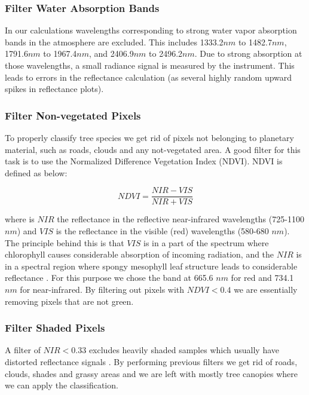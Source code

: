 \documentclass[remotesensing,article,accept,moreauthors,pdftex,12pt,a4paper]{mdpi}
\begin{document}
\subsubsection{Filter Water Absorption Bands}

In our calculations wavelengths corresponding to strong water vapor absorption bands in the atmosphere are excluded. This includes 1333.2$nm$ to 1482.7$nm$, 1791.6$n m$ to 1967.4$n m$, and 2406.9$n m$ to 2496.2$n m$. Due to strong absorption at those wavelengths, a small radiance signal is measured by the instrument. This leads to errors in the reflectance calculation (as several highly random upward spikes in reflectance plots). 

\subsubsection{Filter Non-vegetated Pixels}


To properly classify tree species we get rid of pixels not belonging to planetary material, such as roads, clouds and any not-vegetated area. A good filter for this task is to use the Normalized Difference Vegetation Index (NDVI). NDVI is defined as below:

\begin{equation}\label{xx}
NDVI  = \frac{NIR - VIS}{NIR + VIS}
\end{equation}

where is $NIR$ the reflectance in the reflective near-infrared wavelengths (725-1100 $n m$) and $VIS$ is the reflectance in the visible (red) wavelengths (580-680 $n m$). The principle behind this is that $VIS$ is in a part of the spectrum where chlorophyll causes considerable absorption of incoming radiation, and the $NIR$ is in a spectral region where spongy mesophyll leaf structure leads to considerable reflectance \cite{tucker1979red, jackson1983discrimination}. For this purpose we chose the band at 665.6 $n m$ for red and 734.1 $n m$ for near-infrared. By filtering out pixels with $NDVI < 0.4$ we are essentially removing pixels that are not green. 

\subsubsection{Filter Shaded Pixels}

A filter of $NIR < 0.33$  excludes heavily shaded samples  which usually have distorted reflectance signals \cite{colgan2012mapping}. By performing previous filters we get rid of roads, clouds, shades and grassy areas and we are left with mostly tree canopies where we can apply the classification.
\end{document}
